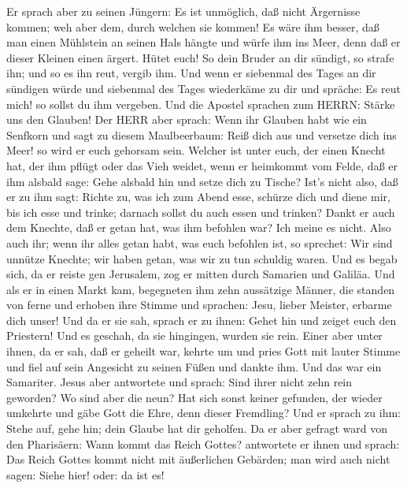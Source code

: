  Er sprach aber zu seinen Jüngern: Es ist unmöglich, daß
nicht Ärgernisse kommen; weh aber dem, durch welchen sie kommen!
 Es wäre ihm besser, daß man einen Mühlstein an seinen Hals
hängte und würfe ihm ins Meer, denn daß er dieser Kleinen einen ärgert.
 Hütet euch! So dein Bruder an dir sündigt, so strafe ihn;
und so es ihn reut, vergib ihm.  Und wenn er siebenmal des
Tages an dir sündigen würde und siebenmal des Tages wiederkäme zu dir
und spräche: Es reut mich! so sollst du ihm vergeben.  Und
die Apostel sprachen zum HERRN: Stärke uns den Glauben!  Der
HERR aber sprach: Wenn ihr Glauben habt wie ein Senfkorn und sagt zu
diesem Maulbeerbaum: Reiß dich aus und versetze dich ins Meer! so wird
er euch gehorsam sein.  Welcher ist unter euch, der einen
Knecht hat, der ihm pflügt oder das Vieh weidet, wenn er heimkommt vom
Felde, daß er ihm alsbald sage: Gehe alsbald hin und setze dich zu
Tische?  Ist's nicht also, daß er zu ihm sagt: Richte zu,
was ich zum Abend esse, schürze dich und diene mir, bis ich esse und
trinke; darnach sollst du auch essen und trinken?  Dankt er
auch dem Knechte, daß er getan hat, was ihm befohlen war? Ich meine es
nicht.  Also auch ihr; wenn ihr alles getan habt, was euch
befohlen ist, so sprechet: Wir sind unnütze Knechte; wir haben getan,
was wir zu tun schuldig waren.  Und es begab sich, da er
reiste gen Jerusalem, zog er mitten durch Samarien und Galiläa.
 Und als er in einen Markt kam, begegneten ihm zehn
aussätzige Männer, die standen von ferne  und erhoben ihre
Stimme und sprachen: Jesu, lieber Meister, erbarme dich unser!
 Und da er sie sah, sprach er zu ihnen: Gehet hin und
zeiget euch den Priestern! Und es geschah, da sie hingingen, wurden sie
rein.  Einer aber unter ihnen, da er sah, daß er geheilt
war, kehrte um und pries Gott mit lauter Stimme  und fiel
auf sein Angesicht zu seinen Füßen und dankte ihm. Und das war ein
Samariter.  Jesus aber antwortete und sprach: Sind ihrer
nicht zehn rein geworden? Wo sind aber die neun?  Hat sich
sonst keiner gefunden, der wieder umkehrte und gäbe Gott die Ehre, denn
dieser Fremdling?  Und er sprach zu ihm: Stehe auf, gehe
hin; dein Glaube hat dir geholfen.  Da er aber gefragt ward
von den Pharisäern: Wann kommt das Reich Gottes? antwortete er ihnen und
sprach: Das Reich Gottes kommt nicht mit äußerlichen Gebärden;
 man wird auch nicht sagen: Siehe hier! oder: da ist es!
